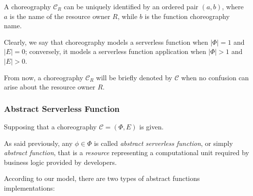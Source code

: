 \documentclass[10pt,a4paper]{report}
\theoremstyle{definition}
\begin{document}
A choreography $\mathcal{C}_R$ can be uniquely identified by an ordered pair $(a, b)$, where $a$ is the name of the resource owner $R$, while $b$ is the function choreography name.

Clearly, we say that choreography models a serverless function when $|\Phi| = 1$ and $|E| = 0$; conversely, it models a serverless function application when $|\Phi| > 1$ and $|E| > 0$.

From now, a choreography $\mathcal{C}_R$ will be briefly denoted by $\mathcal{C}$ when no confusion can arise about the resource owner $R$.

\subsubsection{Abstract Serverless Function}

Supposing that a choreography $\mathcal{C} = (\Phi,E)$ is given.

As said previously, any $\phi \in \Phi$ is called \textit{abstract serverless function}, or simply \textit{abstract function}, that is a \textit{resource} representing a computational unit required by business logic provided by developers.

According to our model, there are two types of abstract functions implementations:
\end{document}

